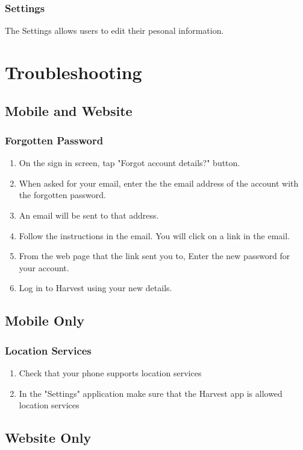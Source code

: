 \documentclass[11pt]{article}
\begin{document}
\subsubsection{Settings}
\label{webSettings}

The Settings allows users to edit their pesonal information.

\newpage
\section{Troubleshooting}

\subsection{Mobile and Website}

\subsubsection{Forgotten Password}
\begin{enumerate}
\item On the sign in screen, tap "Forgot account details?" button.
\item When asked for your email, enter the the email address of the account with the forgotten password.
\item An email will be sent to that address.
\item Follow the instructions in the email. You will click on a link in the email.
\item From the web page that the link sent you to, Enter the new password for your account.
\item Log in to Harvest using your new details.
\end{enumerate}

\subsection{Mobile Only}
\subsubsection{Location Services}
\begin{enumerate}
\item Check that your phone supports location services
\item In the "Settings" application make sure that the Harvest app is allowed location services 
\end{enumerate}

\subsection{Website Only}
\end{document}
